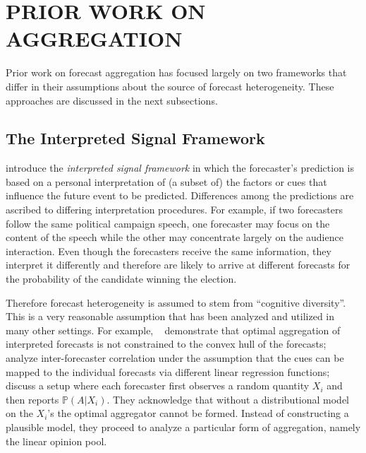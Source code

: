 \documentclass[12pt]{article}
\renewcommand{\P}{\mathbb{P}}
\theoremstyle{definition}
\theoremstyle{definition}
\def\P{{\mathbb P}}
\begin{document}
\section{PRIOR WORK ON AGGREGATION}
\label{sec:prior}
Prior work on forecast aggregation has focused largely on two frameworks that differ in their assumptions about the source of forecast heterogeneity.  These approaches are discussed in the next subsections.

\subsection{The Interpreted Signal Framework}
\label{ss:inerpreted}

\citet{hong2009interpreted} introduce the {\em interpreted signal
framework} in which the forecaster's prediction is based on a personal
interpretation of (a subset of) the factors or cues that influence the
future event to be predicted.  Differences among the 
predictions are ascribed to differing interpretation procedures.  For
example, if two forecasters follow the same political campaign speech,
one forecaster may focus on the content of the speech while the other may
concentrate largely on the audience interaction.  Even though the
forecasters receive the same information, they interpret it
differently and therefore are likely to arrive at different forecasts for the probability of the candidate winning the election.

Therefore forecast heterogeneity is assumed to stem from ``cognitive
diversity''.  This is a very reasonable assumption that has been analyzed and
utilized in many other settings.  For example,
~\citet{parunak2013characterizing} demonstrate that optimal
aggregation of interpreted forecasts is not constrained to the
convex hull of the forecasts; \citet{broomell2009experts} analyze
inter-forecaster correlation under the assumption that the cues can be
mapped to the individual forecasts via different linear regression
functions; \citet{degroot1991optimal} discuss a setup where each forecaster first observes a random quantity $X_i$ and then reports $\P(A | X_i)$. They  acknowledge that without a distributional model on the $X_i$'s the optimal aggregator cannot be formed. Instead of constructing a plausible model, they proceed to analyze a particular form of aggregation, namely the linear opinion pool. 

\end{document}
